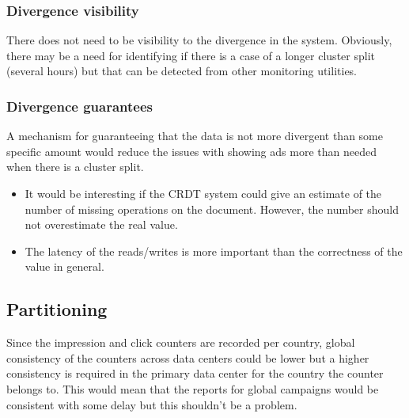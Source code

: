 \documentclass[11pt,a4paper]{report}
\begin{document}
\subsubsection{Divergence visibility}
There does not need to be visibility to the divergence in the system. Obviously, there may be a need for identifying if there is a case of a longer cluster split (several hours) but that can be detected from other monitoring utilities.

\subsubsection{Divergence guarantees}
A mechanism for guaranteeing that the data is not more divergent than some specific amount would reduce the issues with showing ads more than needed when there is a cluster split.

\begin{itemize}
\item It would be interesting if the CRDT system could give an estimate of the number of missing operations on the document. However, the number should not overestimate the real value.
\item The latency of the reads/writes is more important than the correctness of the value in general.
\end{itemize}

\subsection{Partitioning}
Since the impression and click counters are recorded per country, global consistency of the counters across data centers could be lower but a  higher consistency is required in the primary data center for the country the counter belongs to. This would mean that the reports for global campaigns would be consistent with some delay but this shouldn't be a problem.
\end{document}
